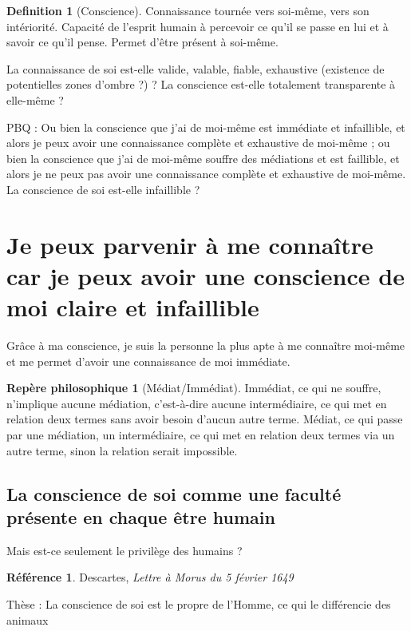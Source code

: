 \documentclass[french]{book}
\theoremstyle{definition}
\newtheorem*{dfn}{Definition}
\newtheorem*{refe}{Référence}
\newtheorem*{rep}{Repère philosophique}
\begin{document}
\begin{dfn}[Conscience]
	Connaissance tournée vers soi-même, vers son intériorité. Capacité de l'esprit humain à percevoir ce qu'il se passe en lui et à savoir ce qu'il pense. Permet d'être présent à soi-même.
\end{dfn}


La connaissance de soi est-elle valide, valable, fiable, exhaustive (existence de potentielles zones d'ombre ?) ? La conscience est-elle totalement transparente à elle-même ?

PBQ :
Ou bien la conscience que j'ai de moi-même est immédiate et infaillible, et alors je peux avoir une connaissance complète et exhaustive de moi-même ; ou bien la conscience que j'ai de moi-même souffre des médiations et est faillible, et alors je ne peux pas avoir une connaissance complète et exhaustive de moi-même. La conscience de soi est-elle infaillible ?


\section{Je peux parvenir à me connaître car je peux avoir une conscience de moi claire et infaillible}

Grâce à ma conscience, je suis la personne la plus apte à me connaître moi-même et me permet d'avoir une connaissance de moi immédiate.

\begin{rep}[Médiat/Immédiat]
Immédiat, ce qui ne souffre, n'implique aucune médiation, c'est-à-dire aucune intermédiaire, ce qui met en relation deux termes sans avoir besoin d'aucun autre terme.
Médiat, ce qui passe par une médiation, un intermédiaire, ce qui met en relation deux termes via un autre terme, sinon la relation serait impossible.
\end{rep}


\subsection{La conscience de soi comme une faculté présente en chaque être humain}

Mais est-ce seulement le privilège des humains ?

\begin{refe}
	Descartes, \textit{Lettre à Morus du 5 février 1649}
\end{refe}

Thèse : La conscience de soi est le propre de l'Homme, ce qui le différencie des animaux
\end{document}
